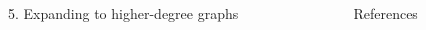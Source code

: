 \documentclass[]{templates/poster}
\begin{document}
\begin{frame}{}
\begin{columns}[t]
  \begin{column}{0.422\linewidth}
  \begin{block}{\Large 5. Expanding to higher-degree graphs}
  \end{block}
  \end{column}
  \begin{column}{0.422\linewidth}
  \begin{block}{\Large References}
  \end{block}
  \end{column}
\end{columns}

\end{frame}

\end{document}
